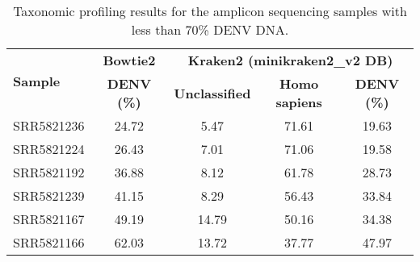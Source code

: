 \begin{scriptsize}
\begin{center}

\begin{longtable}{@{}lcccc@{}}
\caption{Taxonomic profiling results for the amplicon sequencing samples with less than 70\% DENV DNA.}
\label{tab:chap4_s5}\\
\toprule
\multirow{2}{*}{\textbf{Sample}} & \textbf{Bowtie2}   & \multicolumn{3}{c}{\textbf{Kraken2 (minikraken2\_v2 DB)}}        \\* \cmidrule(l){2-5} 
                                 & \textbf{DENV (\%)} & \textbf{Unclassified} & \textbf{Homo sapiens} & \textbf{DENV (\%)} \\* \midrule
SRR5821236 & 24.72 & 5.47  & 71.61 & 19.63 \\*
SRR5821224 & 26.43 & 7.01  & 71.06 & 19.58 \\* 
SRR5821192 & 36.88 & 8.12  & 61.78 & 28.73 \\* 
SRR5821239 & 41.15 & 8.29  & 56.43 & 33.84 \\* 
SRR5821167 & 49.19 & 14.79 & 50.16 & 34.38 \\* 
SRR5821166 & 62.03 & 13.72 & 37.77 & 47.97 \\* 
\bottomrule
\end{longtable}

\end{center}
\end{scriptsize}